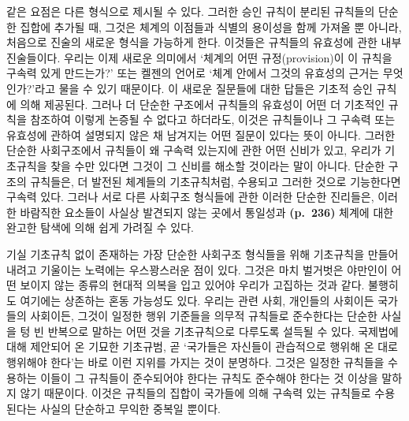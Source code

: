 같은 요점은 다른 형식으로 제시될 수 있다. 그러한 승인 규칙이 분리된
규칙들의 단순한 집합에 추가될 때, 그것은 체계의 이점들과 식별의 용이성을
함께 가져올 뿐 아니라, 처음으로 진술의 새로운 형식을 가능하게 한다.
이것들은 규칙들의 유효성에 관한 내부 진술들이다. 우리는 이제 새로운
의미에서 ‘체계의 어떤 규정(provision)이 이 규칙을 구속력 있게 만드는가?’
또는 켈젠의 언어로 ‘체계 안에서 그것의 유효성의 근거는 무엇인가?’라고
물을 수 있기 때문이다. 이 새로운 질문들에 대한 답들은 기초적 승인 규칙에
의해 제공된다. 그러나 더 단순한 구조에서 규칙들의 유효성이 어떤 더
기초적인 규칙을 참조하여 이렇게 논증될 수 없다고 하더라도, 이것은
규칙들이나 그 구속력 또는 유효성에 관하여 설명되지 않은 채 남겨지는 어떤
질문이 있다는 뜻이 아니다. 그러한 단순한 사회구조에서 규칙들이 왜 구속력
있는지에 관한 어떤 신비가 있고, 우리가 기초규칙을 찾을 수만 있다면
그것이 그 신비를 해소할 것이라는 말이 아니다. 단순한 구조의 규칙들은, 더
발전된 체계들의 기초규칙처럼, 수용되고 그러한 것으로 기능한다면 구속력
있다. 그러나 서로 다른 사회구조 형식들에 관한 이러한 단순한 진리들은,
이러한 바람직한 요소들이 사실상 발견되지 않는 곳에서 통일성과
\textbf{(p.~236)} 체계에 대한 완고한 탐색에 의해 쉽게 가려질 수 있다.

기실 기초규칙 없이 존재하는 가장 단순한 사회구조 형식들을 위해
기초규칙을 만들어 내려고 기울이는 노력에는 우스꽝스러운 점이 있다.
그것은 마치 벌거벗은 야만인이  어떤 보이지 않는 종류의
현대적 의복을 입고 있어야  우리가 고집하는 것과 같다.
불행히도 여기에는 상존하는 혼동 가능성도 있다. 우리는 관련 사회,
개인들의 사회이든 국가들의 사회이든, 그것이 일정한 행위 기준들을 의무적
규칙들로 준수한다는 단순한 사실을 텅 빈 반복으로 말하는 어떤 것을
기초규칙으로 다루도록 설득될 수 있다. 국제법에 대해 제안되어 온 기묘한
기초규범, 곧 ‘국가들은 자신들이 관습적으로 행위해 온 대로 행위해야
한다’는 바로 이런 지위를 가지는 것이 분명하다. 그것은 일정한 규칙들을
수용하는 이들이 그 규칙들이 준수되어야 한다는 규칙도 준수해야 한다는 것
이상을 말하지 않기 때문이다. 이것은 규칙들의 집합이 국가들에 의해 구속력
있는 규칙들로 수용된다는 사실의 단순하고 무익한 중복일 뿐이다.

